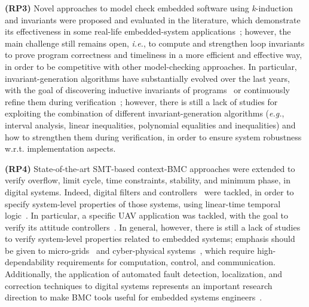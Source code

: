 \documentclass{acm_sen_article}
\begin{document}
\textbf{(RP3)} Novel approaches to model check embedded software using \textit{k}-induction and invariants were proposed and evaluated in the literature, which demonstrate its effectiveness in some real-life embedded-system applications~\cite{Gadelha15,Brain15,Rocha15,Donaldson10,Rocha17}; however, the main challenge still remains open, {\it i.e.}, to compute and strengthen loop invariants to prove program correctness and timeliness in a more efficient and effective way, in order to be competitive with other model-checking approaches. In particular, invariant-generation algorithms have substantially evolved over the last years, with the goal of discovering inductive invariants of programs~\cite{pips:2013,Henry:2012} or continuously refine them during verification~\cite{Beyer15}; however, there is still a lack of studies for exploiting the combination of different invariant-generation algorithms ({\it e.g.}, interval analysis, linear inequalities, polynomial equalities and inequalities) and how to strengthen them during verification, in order to ensure system robustness w.r.t. implementation aspects.

\textbf{(RP4)} State-of-the-art SMT-based context-BMC approaches were extended to verify overflow, limit cycle, time constraints, stability, and minimum phase, in digital systems. Indeed, digital filters and controllers~\cite{dsv_spin2015,esbmc_controller,esbmc_filter} were tackled, in order to specify system-level properties of those systems, using linear-time temporal logic~\cite{JMorse15}. In particular, a specific UAV application was tackled, with the goal to verify its attitude controllers~\cite{Bessa16,Chaves17}. In general, however, there is still a lack of studies to verify system-level properties related to embedded systems; emphasis should be given to micro-grids~\cite{xu15} and cyber-physical systems~\cite{leeCPS2}, which require high-dependability requirements for computation, control, and communication. Additionally, the application of automated fault detection, localization, and correction techniques to digital systems represents an important research direction to make BMC tools useful for embedded systems engineers~\cite{Alves15}.
\end{document}
